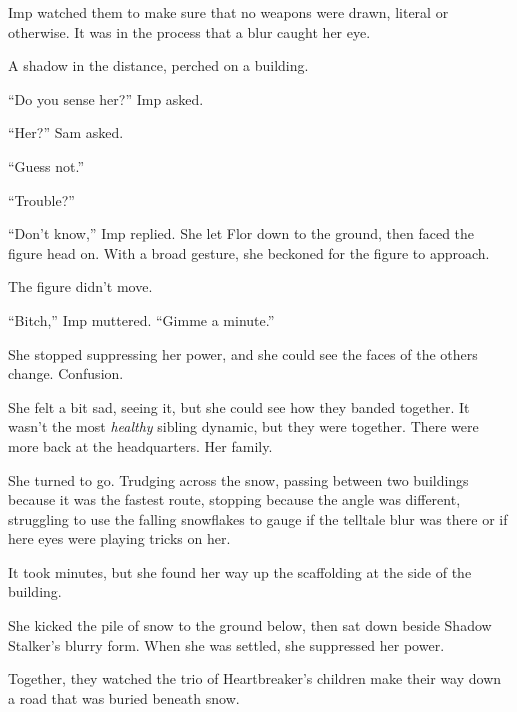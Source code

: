 Imp watched them to make sure that no weapons were drawn, literal or otherwise.  It was in the process that a blur caught her eye.



A shadow in the distance, perched on a building.



``Do you sense her?''  Imp asked.



``Her?''  Sam asked.



``Guess not.''



``Trouble?''



``Don't know,'' Imp replied.  She let Flor down to the ground, then faced the figure head on.  With a broad gesture, she beckoned for the figure to approach.



The figure didn't move.



``Bitch,'' Imp muttered.  ``Gimme a minute.''



She stopped suppressing her power, and she could see the faces of the others change.  Confusion.



She felt a bit sad, seeing it, but she could see how they banded together.  It wasn't the most \emph{healthy} sibling dynamic, but they were together.  There were more back at the headquarters.  Her family.



She turned to go.  Trudging across the snow, passing between two buildings because it was the fastest route, stopping because the angle was different, struggling to use the falling snowflakes to gauge if the telltale blur was there or if here eyes were playing tricks on her.



It took minutes, but she found her way up the scaffolding at the side of the building.



She kicked the pile of snow to the ground below, then sat down beside Shadow Stalker's blurry form.  When she was settled, she suppressed her power.



Together, they watched the trio of Heartbreaker's children make their way down a road that was buried beneath snow.



